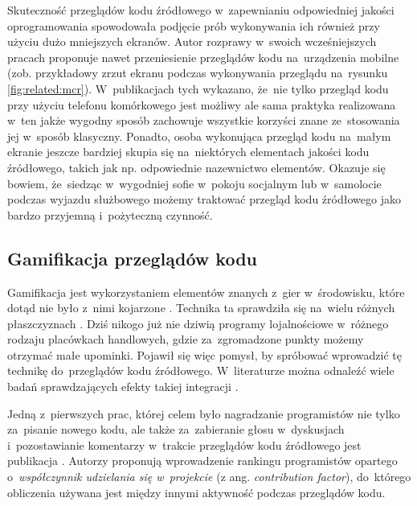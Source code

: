 \documentclass[twoside]{praca}
\begin{document}
Skuteczność przeglądów kodu źródłowego w~zapewnianiu odpowiedniej jakości oprogramowania spowodowała podjęcie prób wykonywania ich również przy użyciu dużo mniejszych ekranów. Autor rozprawy w~swoich wcześniejszych pracach \cite{fracz2017experimental, fracz2016source} proponuje nawet przeniesienie przeglądów kodu na~urządzenia mobilne (zob. przykładowy zrzut ekranu podczas wykonywania przeglądu na~rysunku \ref{fig:related:mcr}). W~publikacjach tych wykazano, że~nie tylko przegląd kodu przy użyciu telefonu komórkowego jest możliwy ale sama praktyka realizowana w~ten jakże wygodny sposób zachowuje wszystkie korzyści znane ze~stosowania jej w~sposób klasyczny. Ponadto, osoba wykonująca przegląd kodu na~małym ekranie jeszcze bardziej skupia się na~niektórych elementach jakości kodu źródłowego, takich jak np. odpowiednie nazewnictwo elementów. Okazuje się bowiem, że~siedząc w~wygodniej sofie w~pokoju socjalnym lub w~samolocie podczas wyjazdu służbowego możemy traktować przegląd kodu źródłowego jako bardzo przyjemną i~pożyteczną czynność.


\subsection{Gamifikacja przeglądów kodu}
\label{sec:related:gamification}

Gamifikacja jest wykorzystaniem elementów znanych z~gier w~środowisku, które dotąd nie było z~nimi kojarzone \cite{deterding2011gamification}. Technika ta sprawdziła się na~wielu różnych płaszczyznach \cite{hamari2014does}. Dziś nikogo już nie dziwią programy lojalnościowe w~różnego rodzaju placówkach handlowych, gdzie za~zgromadzone punkty możemy otrzymać małe upominki. Pojawił się więc pomysł, by spróbować wprowadzić tę technikę do~przeglądów kodu źródłowego. W~literaturze można odnaleźć wiele badań sprawdzających efekty takiej integracji \cite{fracz2018developers, unkelos2015gamifying, khandelwal2017impact}.

Jedną z~pierwszych prac, której celem było nagradzanie programistów nie tylko za~pisanie nowego kodu, ale także za~zabieranie głosu w~dyskusjach i~pozostawianie komentarzy w~trakcie przeglądów kodu źródłowego jest publikacja \cite{gousios2008measuring}. Autorzy proponują wprowadzenie rankingu programistów opartego o~\textit{współczynnik udzielania się w~projekcie} (z ang. \textit{contribution factor}), do~którego obliczenia używana jest między innymi aktywność podczas przeglądów kodu.
\end{document}

